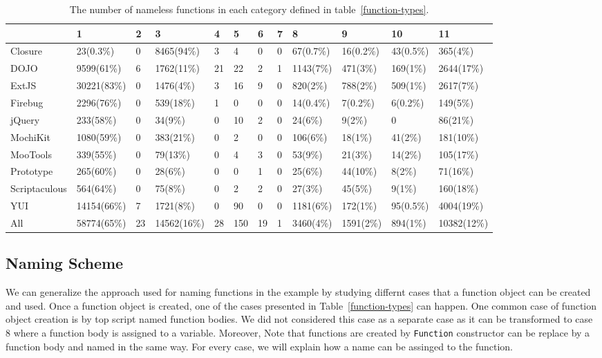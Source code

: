 \documentclass[10pt, preprint]{sigplanconf}
\begin{document}
\begin{table}
\centering
\caption{The number of nameless functions in each category defined in table~\ref{function-types}.}
  \begin{tabular}{ | l | l | l | l | l | l | l | l | l | l | l | l |}
  \hline
     & 1 & 2 & 3 & 4 & 5 & 6 & 7 & 8 & 9 & 10 & 11 \\ 
  \hline 
   Closure       & 23(0.3\%)  & 0  & 8465(94\%) & 3  & 4  & 0  & 0 & 67(0.7\%)& 16(0.2\%)& 43(0.5\%)& 365(4\%)\\ 
  \hline 
   DOJO          & 9599(61\%) & 6  & 1762(11\%) & 21 & 22 & 2  & 1 & 1143(7\%)& 471(3\%) & 169(1\%) & 2644(17\%) \\ 
  \hline 
   ExtJS         & 30221(83\%)& 0  & 1476(4\%)  & 3  & 16 & 9  & 0 & 820(2\%) & 788(2\%) & 509(1\%) & 2617(7\%) \\ 
  \hline 
   Firebug       & 2296(76\%) & 0  & 539(18\%)  & 1  & 0  & 0  & 0 & 14(0.4\%)& 7(0.2\%) & 6(0.2\%) & 149(5\%) \\ 
  \hline 
   jQuery        & 233(58\%)  & 0  & 34(9\%)    & 0  & 10 & 2  & 0 & 24(6\%)  & 9(2\%)   & 0        & 86(21\%)  \\ 
  \hline 
   MochiKit      & 1080(59\%) & 0  & 383(21\%)  & 0  & 2  & 0  & 0 & 106(6\%) & 18(1\%)  & 41(2\%)  & 181(10\%) \\ 
  \hline 
   MooTools      & 339(55\%)  & 0  & 79(13\%)   & 0  & 4  & 3  & 0 & 53(9\%)  & 21(3\%)  & 14(2\%)  & 105(17\%) \\ 
  \hline 
   Prototype     & 265(60\%)  & 0  & 28(6\%)    & 0  & 0  & 1  & 0 & 25(6\%)  & 44(10\%) & 8(2\%)   & 71(16\%) \\ 
  \hline 
   Scriptaculous & 564(64\%)  & 0  & 75(8\%)    & 0  & 2  & 2  & 0 & 27(3\%)  & 45(5\%)  & 9(1\%)   & 160(18\%) \\ 
  \hline 
   YUI           & 14154(66\%)& 7  & 1721(8\%)  & 0  & 90 & 0  & 0 & 1181(6\%)& 172(1\%) & 95(0.5\%)& 4004(19\%)\\ 
  \hline 
   All           & 58774(65\%)& 23 & 14562(16\%)& 28 & 150& 19 & 1 & 3460(4\%)& 1591(2\%)& 894(1\%) & 10382(12\%) \\ 
  \hline 
  \end{tabular}
 \label{function-types-count} 
\end{table}    

\subsection{Naming Scheme}
We can generalize the approach used for naming functions in the example by studying differnt cases that a function object can be created and used. Once a function object is created, one of the cases presented in Table~\ref{function-types} can happen. One common case of function object creation is by top script named function bodies. We did not considered this case as a separate case as it can be transformed to case 8 where a function body is assigned to a variable. Moreover, Note that functions are created by {\small\texttt{Function}} constructor can be replace by a function body and named in the same way. For every case, we will explain how a name can be assinged to the function.
\end{document}
